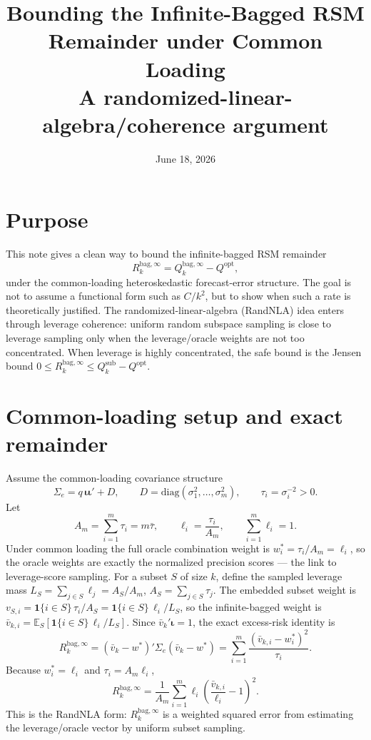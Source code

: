 \documentclass[11pt]{article}
\title{Bounding the Infinite-Bagged RSM Remainder under Common Loading\\
\large A randomized-linear-algebra/coherence argument}
\date{June 18, 2026}
\newcommand{\Sig}{\Sigma_e}
\newcommand{\E}{\mathbb{E}}
\newcommand{\diag}{\mathrm{diag}}
\newcommand{\Rk}{R_k^{\mathrm{bag},\infty}}
\newcommand{\Qsub}{Q_k^{\mathrm{sub}}}
\newcommand{\Qopt}{Q^{\mathrm{opt}}}
\newcommand{\iotab}{\bm{\iota}}
\begin{document}
\maketitle

\section{Purpose}
This note gives a clean way to bound the infinite-bagged RSM remainder
\[
  \Rk = Q_k^{\mathrm{bag},\infty} - \Qopt,
\]
under the common-loading heteroskedastic forecast-error structure. The goal is not to
assume a functional form such as $C/k^2$, but to show when such a rate is theoretically
justified. The randomized-linear-algebra (RandNLA) idea enters through leverage coherence:
uniform random subspace sampling is close to leverage sampling only when the leverage/oracle
weights are not too concentrated. When leverage is highly concentrated, the safe bound is the
Jensen bound $0\le \Rk \le \Qsub - \Qopt$.

\section{Common-loading setup and exact remainder}
Assume the common-loading covariance structure
\[
  \Sig = q\,\iotab\iotab' + D,\qquad D=\diag(\sigma_1^2,\dots,\sigma_m^2),
  \qquad \tau_i=\sigma_i^{-2}>0.
\]
Let
\[
  A_m=\sum_{i=1}^m\tau_i=m\bar\tau,\qquad \ell_i=\frac{\tau_i}{A_m},
  \qquad \sum_{i=1}^m\ell_i=1.
\]
Under common loading the full oracle combination weight is $w_i^*=\tau_i/A_m=\ell_i$, so the
oracle weights are exactly the normalized precision scores --- the link to leverage-score
sampling. For a subset $S$ of size $k$, define the sampled leverage mass
$L_S=\sum_{j\in S}\ell_j=A_S/A_m$, $A_S=\sum_{j\in S}\tau_j$. The embedded subset weight is
$v_{S,i}=\mathbf 1\{i\in S\}\,\tau_i/A_S=\mathbf 1\{i\in S\}\,\ell_i/L_S$, so the
infinite-bagged weight is $\bar v_{k,i}=\E_S[\mathbf 1\{i\in S\}\,\ell_i/L_S]$.
Since $\bar v_k'\iotab=1$, the exact excess-risk identity is
\[
  \Rk=(\bar v_k-w^*)'\Sig(\bar v_k-w^*)=\sum_{i=1}^m\frac{(\bar v_{k,i}-w_i^*)^2}{\tau_i}.
\]
Because $w_i^*=\ell_i$ and $\tau_i=A_m\ell_i$,
\begin{equation}\label{eq:R1}
  \Rk=\frac{1}{A_m}\sum_{i=1}^m\ell_i\left(\frac{\bar v_{k,i}}{\ell_i}-1\right)^2.
\end{equation}
This is the RandNLA form: $\Rk$ is a weighted squared error from estimating the
leverage/oracle vector by uniform subset sampling.
\end{document}
